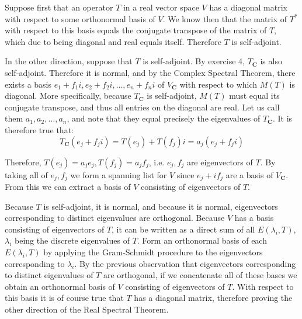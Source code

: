 \begin{solution}

    Suppose first that an operator $T$ in a real vector space $V$ has a diagonal matrix with respect to some orthonormal basis of $V$. We know then that the matrix of $T^*$ with respect to this basis equals the conjugate transpose of the matrix of $T$, which due to being diagonal and real equals itself. Therefore $T$ is self-adjoint.

    In the other direction, suppose that $T$ is self-adjoint. By exercise 4, $T_\mathbf{C}$ is also self-adjoint. Therefore it is normal, and by the Complex Spectral Theorem, there exists a basis $e_1 + f_1 i, e_2 +f_2 i, \ldots, e_n + f_n i$ of $V_\mathbf{C}$ with respect to which $M(T)$ is diagonal. More specifically, because $T_\mathbf{C}$ is self-adjoint, $M(T)$ must equal its conjugate transpose, and thus all entries on the diagonal are real. Let us call them $a_1, a_2, \ldots, a_n$, and note that they equal precisely the eigenvalues of $T_\mathbf{C}$. It is therefore true that:
    $$T_\mathbf{C}(e_j + f_j i) = T(e_j) + T(f_j)i = a_j(e_j + f_j i)$$

    Therefore, $T(e_j) = a_j e_j, T(f_j) = a_j f_j$, i.e. $e_j, f_j$ are eigenvectors of $T$. By taking all of $e_j, f_j$ we form a spanning list for $V$ since $e_j + i f_j$ are a basis of $V_\mathbf{C}$. From this we can extract a basis of $V$ consisting of eigenvectors of $T$.

    Because $T$ is self-adjoint, it is normal, and because it is normal, eigenvectors corresponding to distinct eigenvalues are orthogonal. Because $V$ has a basis consisting of eigenvectors of $T$, it can be written as a direct sum of all $E(\lambda_i, T)$, $\lambda_i$ being the discrete eigenvalues of $T$. Form an orthonormal basis of each $E(\lambda_i, T)$ by applying the Gram-Schmidt procedure to the eigenvectors corresponding to $\lambda_i$. By the previous observation that eigenvectors corresponding to distinct eigenvalues of $T$ are orthogonal, if we concatenate all of these bases we obtain an orthonormal basis of $V$ consisting of eigenvectors of $T$. With respect to this basis it is of course true that $T$ has a diagonal matrix, therefore proving the other direction of the Real Spectral Theorem.
\end{solution}
